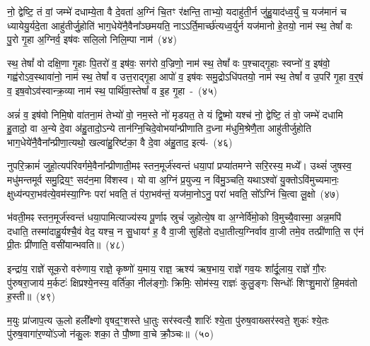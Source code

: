 नो॒ द्वेष्टि॒ तं वां॒ जम्भे॑ दधाम्ये॒ता वै दे॒वता॑ अ॒ग्निं चि॒तꣳ र॑क्षन्ति॒ ताभ्यो॒ यदाहु॑ती॒र्न जु॑हु॒याद॑ध्व॒र्युं च॒ यज॑मानं च ध्यायेयु॒र्यदे॒ता आहु॑तीर्जु॒होति॑ भाग॒\-धेये॑नै॒वैना᳚ञ्छमयति॒ नाऽऽर्ति॒मार्च्छ॑त्यध्व॒र्युर्न यज॑मानो हे॒तयो॒ नाम॑ स्थ॒ तेषां᳚ वः पु॒रो गृ॒हा अ॒ग्निर्व॒ इष॑वः सलि॒लो निलि॒म्पा नाम॑~(४४)\ip

स्थ॒ तेषां᳚ वो दक्षि॒णा गृ॒हाः पि॒तरो॑ व॒ इष॑वः॒ सग॑रो व॒ज्रिणो॒ नाम॑ स्थ॒ तेषां᳚ वः प॒श्चाद्गृ॒हाः स्वप्नो॑ व॒ इष॑वो॒ गह्व॑रो\-ऽव॒स्थावा॑नो॒ नाम॑ स्थ॒ तेषां᳚ व उत्त॒राद्गृ॒हा आपो॑ व॒ इष॑वः समु॒द्रो\-ऽधि॑पतयो॒ नाम॑ स्थ॒ तेषां᳚ व उ॒परि॑ गृ॒हा व॒र्॒\mbox{}षं व॒ इष॒वो\-ऽव॑स्वान्क्र॒व्या नाम॑ स्थ॒ पार्थि॑वा॒स्तेषां᳚ व इ॒ह गृ॒हा~-~(४५)\ip

अन्नं॑ व॒ इष॑वो निमि॒षो वा॑तना॒मं तेभ्यो॑ वो॒ नम॒स्ते नो॑ मृडयत॒ ते यं द्वि॒ष्मो यश्च॑ नो॒ द्वेष्टि॒ तं वो॒ जम्भे॑ दधामि हु॒तादो॒ वा अ॒न्ये दे॒वा अ॑हु॒तादो॒\-ऽन्ये तान॑ग्नि॒चिदे॒वोभया᳚न्प्रीणाति द॒ध्ना म॑धुमि॒श्रेणै॒ता आहु॑तीर्जुहोति भाग॒\-धेये॑नै॒वैना᳚न्प्रीणा॒त्यथो॒ खल्वा॑हु॒रिष्ट॑का॒ वै दे॒वा अ॑हु॒ताद॒ इत्य॑-~(४६)\ip

नुपरि॒क्रामं॑ जुहो॒त्यप॑रिवर्गमे॒वैना᳚न्प्रीणाती॒मꣴ स्तन॒मूर्ज॑स्वन्तं धया॒पां प्रप्या॑तमग्ने सरि॒रस्य॒ मध्ये᳚। उथ्सं॑ जुषस्व॒ मधु॑मन्तमूर्व समु॒द्रिय॒ꣳ॒ सद॑न॒मा वि॑शस्व। यो वा अ॒ग्निं प्र॒युज्य॒ न वि॑मु॒ञ्चति॒ यथा\-ऽश्वो॑ यु॒क्तो\-ऽवि॑मुच्यमानः॒ क्षुध्य॑न्परा॒भव॑त्ये॒वम॑स्या॒ग्निः परा॑ भवति॒ तं प॑रा॒भव॑न्तं॒ यज॑मा॒नो\-ऽनु॒ परा॑ भवति॒ सो᳚\-ऽग्निं चि॒त्वा लू॒क्षो~(४७)\ip

भ॑वती॒मꣴ स्तन॒मूर्ज॑स्वन्तं धया॒पामित्याज्य॑स्य पू॒र्णाꣴ स्रुचं॑ जुहोत्ये॒ष वा अ॒ग्नेर्वि॑मो॒को वि॒मुच्यै॒वास्मा॒ अन्न॒मपि॑ दधाति॒ तस्मा॑दाहु॒र्यश्चै॒वं वेद॒ यश्च॒ न सु॒धायꣳ॑ ह॒ वै वा॒जी सुहि॑तो दधा॒तीत्य॒ग्निर्वाव वा॒जी तमे॒व तत्प्री॑णाति॒ स ए॑नं प्री॒तः प्री॑णाति॒ वसी॑यान्भवति॥~(४८)\ip

{\anuvakamend[{प्र॒तीची॒ दिक्तस्या᳚स्ते द्वि॒ष्मो यश्च॑ निलि॒म्पा नामे॒ह गृ॒हा इति॑ लू॒क्षो वसी॑यान्भवति}]}%

इन्द्रा॑य॒ राज्ञे॑ सूक॒रो वरु॑णाय॒ राज्ञे॒ कृष्णो॑ य॒माय॒ राज्ञ॒ ऋश्य॑ ऋष॒भाय॒ राज्ञे॑ गव॒यः शा᳚र्दू॒लाय॒ राज्ञे॑ गौ॒रः पु॑रुषरा॒जाय॑ म॒र्कटः॑ क्षिप्रश्ये॒नस्य॒ वर्ति॑का॒ नील॑ङ्गोः॒ क्रिमिः॒ सोम॑स्य॒ राज्ञः॑ कुलु॒ङ्गः सिन्धोः᳚ शिꣳशु॒मारो॑ हि॒मव॑तो ह॒स्ती॥~(४९)\ip

{\anuvakamend[{इन्द्रा॑या॒ष्टाविꣳ॑शतिः}]}%

म॒युः प्रा॑जाप॒त्य ऊ॒लो हली᳚क्ष्णो वृषद॒ꣳ॒शस्ते धा॒तुः सर॑स्वत्यै॒ शारिः॑ श्ये॒ता पु॑रुष॒वाख्सर॑स्वते॒ शुकः॑ श्ये॒तः पु॑रुष॒वागा॑र॒ण्यो॑\-ऽजो न॑कु॒लः शका॒ ते पौ॒ष्णा वा॒चे क्रौ॒ञ्चः॥~(५०)\ip

